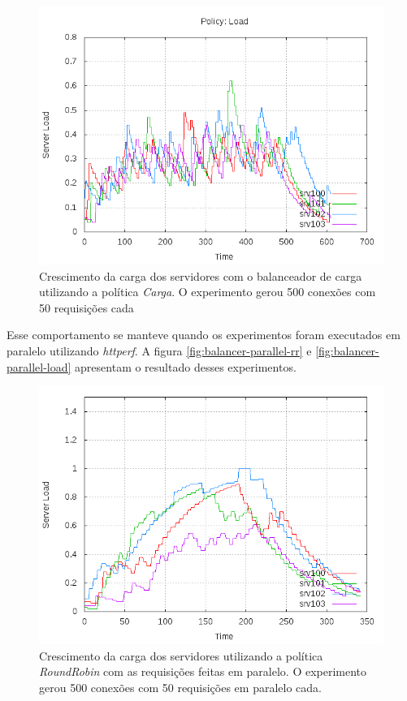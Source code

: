 \begin{figure}[htb!]
    \centering
    \includegraphics[width=\linewidth]{img/balancer-serial-load}
    \caption{Crescimento da carga dos servidores com o balanceador de carga
    utilizando a política \emph{Carga}. O experimento gerou 500 conexões com 
    50 requisições cada}
    \label{fig:serial-l}
\end{figure}

Esse comportamento se manteve quando os experimentos foram executados em 
paralelo utilizando \emph{httperf}.
A figura \ref{fig:balancer-parallel-rr} e \ref{fig:balancer-parallel-load}
apresentam o resultado desses experimentos.

\begin{figure}[htb!]
    \centering
    \includegraphics[width=0.9\linewidth]{img/balancer-parallel-rr}
    \caption{Crescimento da carga dos servidores utilizando a política 
    \emph{RoundRobin} com as requisições feitas em paralelo. O experimento
    gerou 500 conexões com 50 requisições em paralelo cada.}
    \label{fig:parallel-rr}
\end{figure}

